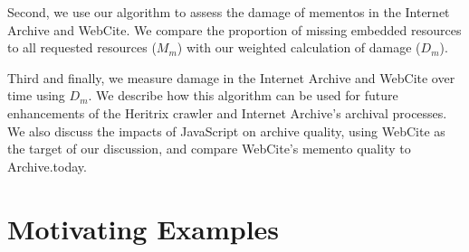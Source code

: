 Second, we use our algorithm to assess the damage of mementos in the Internet Archive and WebCite. We compare the proportion of missing embedded resources to all requested resources ($M_m$) with our weighted calculation of damage ($D_m$). %

Third and finally, we measure damage in the Internet Archive and WebCite over time using $D_m$. We describe how this algorithm can be used for future enhancements of the Heritrix crawler \cite{Sigurosson:Incremental-Heritrix, heritrix} and Internet Archive's archival processes. We also discuss the impacts of JavaScript on archive quality, using WebCite as the target of our discussion, and compare WebCite's memento quality to Archive.today.



\section{Motivating Examples}
\label{example}



